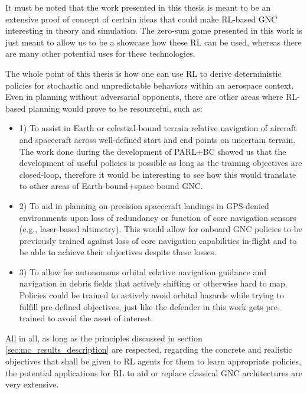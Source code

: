 It must be noted that the work presented in this thesis is meant to be an extensive proof of concept of certain ideas that could make RL-based GNC interesting in theory and simulation. The zero-sum game presented in this work is just meant to allow us to be a showcase how these RL can be used, whereas there are many other potential uses for these technologies.

The whole point of this thesis is how one can use RL to derive deterministic policies for stochastic and unpredictable behaviors within an aerospace context. Even in planning without adversarial opponents, there are other areas where RL-based planning would prove to be resourceful, such as:

\begin{itemize}

    \item 1) To assist in Earth or celestial-bound terrain relative navigation of aircraft and spacecraft across well-defined start and end points on uncertain terrain. The work done during the development of PARL+BC showed us that the development of useful policies is possible as long as the training objectives are closed-loop, therefore it would be interesting to see how this would translate to other areas of Earth-bound+space bound GNC.
    
    
    \item 2) To aid in planning on precision spacecraft landings in GPS-denied environments upon loss of redundancy or function of core navigation sensors (e.g., laser-based altimetry). This would allow for onboard GNC policies to be previously trained against loss of core navigation capabilities in-flight and to be able to achieve their objectives despite these losses.

    \item 3) To allow for autonomous orbital relative navigation guidance and navigation in debris fields that actively shifting or otherwise hard to map. Policies could be trained to actively avoid orbital hazards while trying to fulfill pre-defined objectives, just like the defender in this work gets pre-trained to avoid the asset of interest.
\end{itemize}


All in all, as long as the principles discussed in section \ref{sec:mc_results_description} are respected, regarding the concrete and realistic objectives that shall be given to RL agents for them to learn appropriate policies, the potential applications for RL to aid or replace classical GNC architectures are very extensive.
